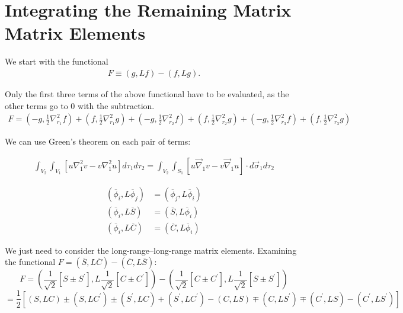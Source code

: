 \documentclass[Dissertation.tex]{subfiles}
\begin{document}
\section{Integrating the Remaining Matrix Matrix Elements}
We start with the functional
\begin{align}
	F \equiv \left({g,{Lf}}\right)-\left({f,{Lg}}\right).
\end{align}

Only the first three terms of the above functional have to be evaluated, as the other terms go to 0 with the subtraction.
\begin{align}
	F=\left({-g,{\frac {1}{2}{\nabla }_{{{r}_{{1}}}}^{{2}}f}}\right)+\left({f,{\frac {1}{2}{\nabla }_{{{r}_{{1}}}}^{{2}}g}}\right)+
	\left({-g,{\frac {1}{2}{\nabla }_{{{r}_{{2}}}}^{{2}}f}}\right)+\left({f,{\frac {1}{2}{\nabla }_{{{r}_{{2}}}}^{{2}}g}}\right)+
	\left({-g,{\frac {1}{2}{\nabla }_{{{r}_{{3}}}}^{{2}}f}}\right)+\left({f,{\frac {1}{2}{\nabla }_{{{r}_{{3}}}}^{{2}}g}}\right)
\end{align}

We can use Green's theorem on each pair of terms:

\begin{align}
	{\int _{{V}_{{2}}}{{\int _{{V}_{{1}}}{\left[{u{\nabla }_{{1}}^{{2}}v-v{\nabla }_{{1}}^{{2}}u}\right]{d{{\tau }_{{1}}}}}}{d{{\tau }_{{2}}}}}}
	= \int_{V_2} \int_{S_1} \left[u \vec{\nabla}_1 v - v \vec{\nabla}_1 u \right] \cdot d\vec{\sigma}_1 d\tau_2
\end{align}

\begin{subequations}\label{elem_symm}
\begin{align}
\left({{{\overline\phi }}_{{i}},{L{{\overline\phi }}_{{j}}}}\right) &= \left({{{\overline\phi }}_{{j}},{L{{\overline\phi }}_{{i}}}}\right) \\
\left({{{\overline\phi }}_{{i}},{L\overline{S}}}\right) &= \left({\overline{S},{L{{\overline\phi }}_{{i}}}}\right) \\
\left({{{\overline\phi }}_{{i}},{L\overline{C}}}\right) &= \left({\overline{C},{L{{\overline\phi }}_{{i}}}}\right)
\end{align}
\end{subequations}

We just need to consider the long-range--long-range matrix elements.  Examining the functional
 $F = \left(\overline{S}, L\overline{C}\right) - \left(\overline{C}, L\overline{S}\right)$:
\begin{equation*}
F = \left(\frac{1}{\sqrt{2}} \left[S \pm S^\prime \right], L \frac{1}{\sqrt{2}}\left[C \pm C^\prime \right] \right) -
    \left(\frac{1}{\sqrt{2}} \left[C \pm C^\prime \right], L \frac{1}{\sqrt{2}}\left[S \pm S^\prime \right] \right)
\end{equation*}
\begin{equation}
= \frac{1}{2}\left[(S,LC) \pm (S,LC^\prime) \pm (S^\prime,LC) + (S^\prime,LC^\prime) - (C,LS) \mp (C,LS^\prime) \mp (C^\prime,LS) - (C^\prime,LS^\prime)\right]
\end{equation}
\end{document}

